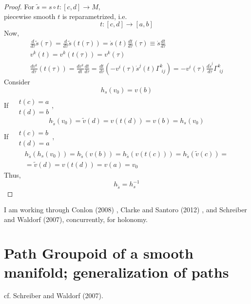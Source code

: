 \begin{proof}
For $\widetilde{s} = s\circ t:[c,d] \to M$, \\
piecewise smooth $t$ is reparametrized, i.e. 
\begin{equation}
	t:[c,d] \to [a,b]
\end{equation}  
Now, 
\[
\begin{gathered}
	\frac{d}{d\tau}\widetilde{s}(\tau) = \frac{d}{d\tau} \widetilde{s}(t(\tau)) = \dot{s}(t) \frac{dt}{d\tau}(\tau) \equiv \dot{s} \frac{dt}{d\tau} \\ 
v^k(t) = v^k(t(\tau)) = v^k(\tau) \\ 
 \frac{dv^k}{d\tau}(t(\tau) ) = \frac{dv^k}{dt} \frac{dt}{ d\tau } = \frac{dt}{d\tau}(-v^i( \tau) \dot{s}^j(t) \Gamma^k_{ \,\, ij} ) = -v^i(\tau) \frac{d\widetilde{s}^j }{ d\tau} \Gamma^k_{ \, \, ij} 
\end{gathered}
\]
Consider 
\[
h_s(v_0) = v(b)
\]
If $\begin{aligned} & \quad \\ 
	& t(c) = a \\ 
	& t(d)=b \end{aligned}$, 
\[
h_{\widetilde{s}}(v_0) = \widetilde{v}(d) = v(t(d)) = v(b) = h_s(v_0)
\]
If $\begin{aligned} & \quad \\ 
	& t(c) = b \\ 
	& t(d)=a \end{aligned}$, 
\[
\begin{gathered}
h_{\widetilde{s}}(h_s(v_0) )  = h_{\widetilde{s}}( v(b)) = h_{\widetilde{s}}(v(t(c))) = h_{\widetilde{s}}(\widetilde{v}(c)) = \\
	= \widetilde{v}(d) = v(t(d)) = v(a) = v_0
\end{gathered}
\]
Thus, 
\[
\boxed{ h_{\widetilde{s}}= h_s^{-1} }
\]


\end{proof}

I am working through Conlon (2008) \cite{dgdt:Conl2008} , Clarke and Santoro (2012) \cite{dgdt:ClSa2012}, and Schreiber and Waldorf (2007)\cite{dgdt:ScWa2007}, concurrently, for holonomy.  

\section{Path Groupoid of a smooth manifold; generalization of paths}
cf. Schreiber and Waldorf (2007)\cite{dgdt:ScWa2007}.  

